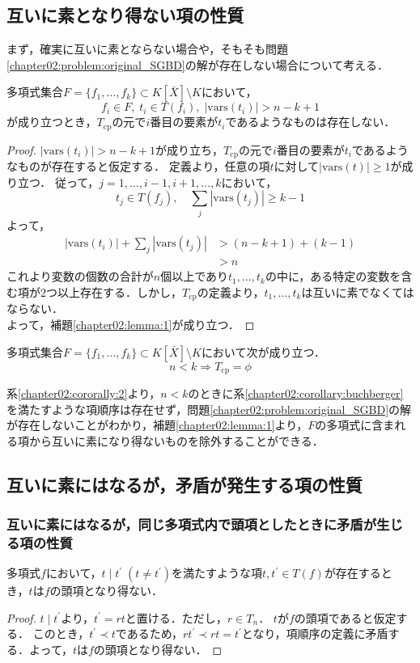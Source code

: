 \subsection{互いに素となり得ない項の性質}
まず，確実に互いに素とならない場合や，そもそも問題\ref{chapter02:problem:original_SGBD}の解が存在しない場合について考える．
\begin{lemma}
	\label{chapter02:lemma:1}
	多項式集合$F=\{ f_1, \dots, f_k \} \subset K[\bar{X}]\setminus K$において，
	$$f_i \in F, \; t_i \in T(f_i), \; |\mathrm{vars}(t_i)| > n - k + 1$$
	が成り立つとき，$T_{\mathrm{cp}}$の元で$i$番目の要素が$t_i$であるようなものは存在しない．
\end{lemma}
\begin{proof}
	$|\mathrm{vars}(t_i)| > n - k + 1$が成り立ち，$T_{\mathrm{cp}}$の元で$i$番目の要素が$t_i$であるようなものが存在すると仮定する．
	定義より，任意の項$t$に対して$|\mathrm{vars}(t)| \ge 1$が成り立つ．
	従って，$j = 1, \dots, i-1, i+1, \dots, k$において，
	$$t_j \in T(f_j), \quad \sum_j |\mathrm{vars}(t_j)| \ge k -1$$
	よって，
	\begin{align*}
		|\mathrm{vars}(t_i)| + \sum_j|\mathrm{vars}(t_j)| &> (n - k + 1) + (k - 1)\\
		& > n
	\end{align*}
	これより変数の個数の合計が$n$個以上であり$t_1, \dots, t_k$の中に，ある特定の変数を含む項が$2$つ以上存在する．しかし，$T_{\mathrm{cp}}$の定義より，$t_1,\dots, t_k$は互いに素でなくてはならない．\\
	よって，補題\ref{chapter02:lemma:1}が成り立つ．
\end{proof}
\begin{corollary}
	\label{chapter02:cororally:2}
	多項式集合$F=\{ f_1, \dots, f_k \} \subset K[\bar{X}]\setminus K$において次が成り立つ．
	$$n<k \Longrightarrow T_{\mathrm{cp}}= \phi$$
\end{corollary}
系\ref{chapter02:cororally:2}より，$n<k$のときに系\ref{chapter02:corollary:buchberger}を満たすような項順序は存在せず，問題\ref{chapter02:problem:original_SGBD}の解が存在しないことがわかり，補題\ref{chapter02:lemma:1}より，$F$の多項式に含まれる項から互いに素になり得ないものを除外することができる．
\subsection{互いに素にはなるが，矛盾が発生する項の性質}
\subsubsection{互いに素にはなるが，同じ多項式内で頭項としたときに矛盾が生じる項の性質}
\begin{lemma}
	\label{chapter02:lemma:3}
	多項式$f$において，$t \mid t^\prime\; (t \ne t^\prime)$を満たすような項$t, t^\prime \in T(f)$が存在するとき，$t$は$f$の頭項となり得ない．
\end{lemma}
\begin{proof}
	$t \mid t^\prime$より，$t^\prime = rt$と置ける．ただし，$r\in T_n$．
	$t$が$f$の頭項であると仮定する．
	このとき，$t^\prime \prec t$であるため，$rt^\prime \prec rt = t^\prime$となり，項順序の定義に矛盾する．よって，$t$は$f$の頭項となり得ない．
\end{proof}


